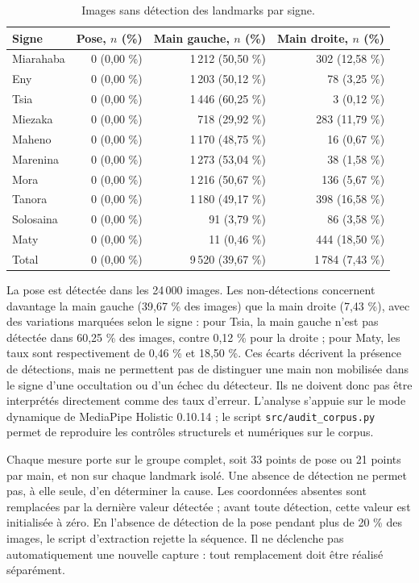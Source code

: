 \begin{table}[ht]
\centering
\small
\caption{Images sans détection des landmarks par signe.}
\label{tab:non-detection-landmarks}
\begin{tabular}{|l|r|r|r|}
\hline
Signe & Pose, $n$ (\%) & Main gauche, $n$ (\%) & Main droite, $n$ (\%) \\
\hline
Miarahaba & 0 (0,00 \%) & 1\,212 (50,50 \%) & 302 (12,58 \%) \\
Eny & 0 (0,00 \%) & 1\,203 (50,12 \%) & 78 (3,25 \%) \\
Tsia & 0 (0,00 \%) & 1\,446 (60,25 \%) & 3 (0,12 \%) \\
Miezaka & 0 (0,00 \%) & 718 (29,92 \%) & 283 (11,79 \%) \\
Maheno & 0 (0,00 \%) & 1\,170 (48,75 \%) & 16 (0,67 \%) \\
Marenina & 0 (0,00 \%) & 1\,273 (53,04 \%) & 38 (1,58 \%) \\
Mora & 0 (0,00 \%) & 1\,216 (50,67 \%) & 136 (5,67 \%) \\
Tanora & 0 (0,00 \%) & 1\,180 (49,17 \%) & 398 (16,58 \%) \\
Solosaina & 0 (0,00 \%) & 91 (3,79 \%) & 86 (3,58 \%) \\
Maty & 0 (0,00 \%) & 11 (0,46 \%) & 444 (18,50 \%) \\
\hline
Total & 0 (0,00 \%) & 9\,520 (39,67 \%) & 1\,784 (7,43 \%) \\
\hline
\end{tabular}
\end{table}

La pose est détectée dans les 24\,000 images. Les non-détections concernent davantage la main gauche (39,67 \% des images) que la main droite (7,43 \%), avec des variations marquées selon le signe : pour Tsia, la main gauche n'est pas détectée dans 60,25 \% des images, contre 0,12 \% pour la droite ; pour Maty, les taux sont respectivement de 0,46 \% et 18,50 \%. Ces écarts décrivent la présence de détections, mais ne permettent pas de distinguer une main non mobilisée dans le signe d'une occultation ou d'un échec du détecteur. Ils ne doivent donc pas être interprétés directement comme des taux d'erreur. L'analyse s'appuie sur le mode dynamique de MediaPipe Holistic 0.10.14 ; le script \texttt{src/audit\_corpus.py} permet de reproduire les contrôles structurels et numériques sur le corpus.

Chaque mesure porte sur le groupe complet, soit 33 points de pose ou 21 points par main, et non sur chaque landmark isolé. Une absence de détection ne permet pas, à elle seule, d'en déterminer la cause. Les coordonnées absentes sont remplacées par la dernière valeur détectée ; avant toute détection, cette valeur est initialisée à zéro. En l'absence de détection de la pose pendant plus de 20 \% des images, le script d'extraction rejette la séquence. Il ne déclenche pas automatiquement une nouvelle capture : tout remplacement doit être réalisé séparément.

